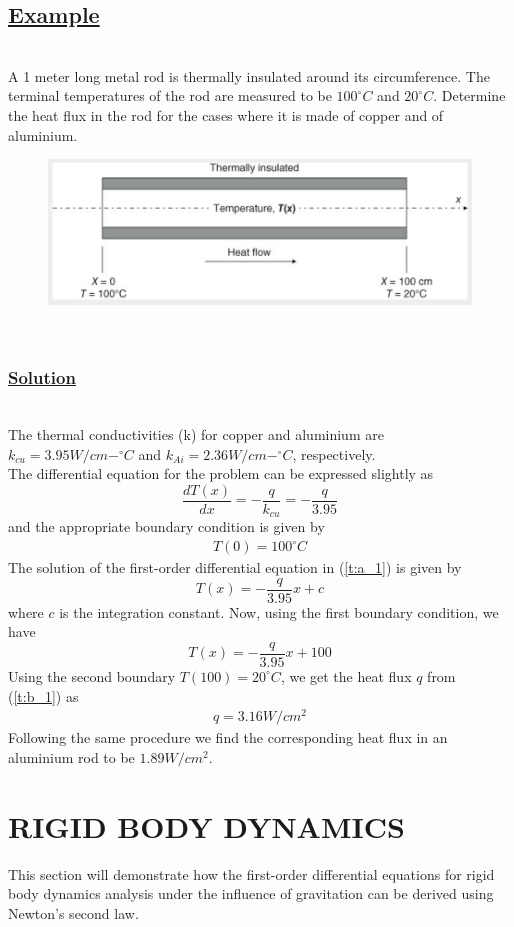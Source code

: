 \documentclass[11pt]{report}
\newcommand{\ubt}[1]{\textbf{\underline{#1}}}
\newcommand{\sps}{\\[0.2cm]}
\newcommand{\spn}[1]{\\[#1cm]}
\newcommand{\refn}[1]{(\ref{#1})}
\newcommand{\solution}{\subsubsection{\ubt{Solution}}{~}\spn{-1}}
\newcommand{\eg}{\subsection*{\ubt{Example}}{~}\spn{-1}}
\begin{document}
	\eg
	A 1 meter long metal rod is thermally insulated around its circumference. The terminal temperatures of the rod are measured to be $100^{\circ}C$ and $20^{\circ}C$. Determine the heat flux in the rod for the cases where it is made of copper and of aluminium.
	\begin{figure}[h!]
		\centering
		\includegraphics[width=0.8\linewidth]{heatflow}
	\end{figure}
	{~}\spn{-1.3}
	\solution
	The thermal conductivities (k) for copper and aluminium are $k_{cu}=3.95W/cm-^{\circ}C$ and $k_{Ai} = 2.36W/cm-^{\circ}C$, respectively. \sps
	The differential equation for the problem can be expressed slightly as
	\begin{equation}
		\frac{dT(x)}{dx} = - \frac{q}{k_{cu}} = -\frac{q}{3.95}\tag{a}\label{t:a_1}
	\end{equation}
	and the appropriate boundary condition is given by
	\begin{eqnarray*}
		T(0) = 100^{\circ}C
	\end{eqnarray*}
	The solution of the first-order differential equation in \refn{t:a_1} is given by
	\begin{equation*}
		T(x) = -\frac{q}{3.95}x + c
	\end{equation*}
	where $c$ is the integration constant. Now, using the first boundary condition, we have
	\begin{equation}
		T(x) = -\frac{q}{3.95}x + 100\tag{b}\label{t:b_1}
	\end{equation}
	Using the second boundary $T(100)=20^{\circ}C$, we get the heat flux $q$ from \refn{t:b_1} as
	\begin{eqnarray*}
		q = 3.16 W/cm^2
	\end{eqnarray*}
	Following the same procedure we find the corresponding heat flux in an aluminium rod to be $1.89 W/cm^2$.
	
	\section{RIGID BODY DYNAMICS}
	This section will demonstrate how the first-order differential equations for rigid body dynamics analysis under the influence of gravitation can be derived using Newton's second law.\\
	
\end{document}
